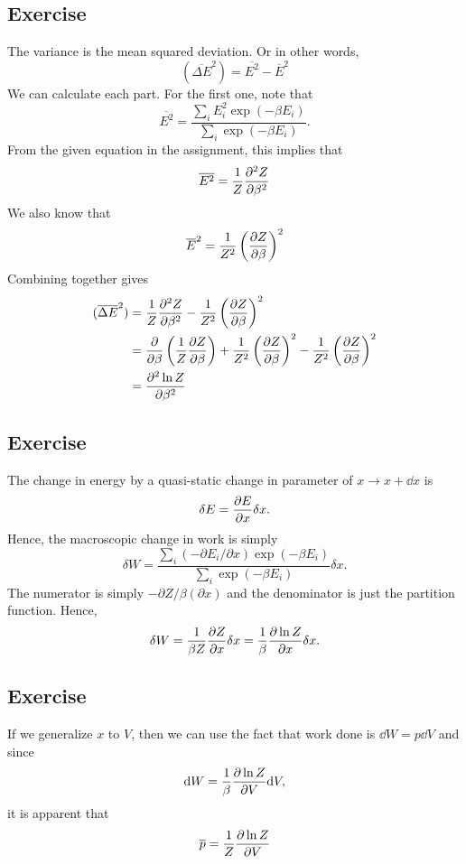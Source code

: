 \subsection{Exercise}
The variance is the mean squared deviation. Or in other words, 
\begin{equation}
    (\overline{\Delta E}^2) = \overline{E^2} - \overline{E}^2
\end{equation}
We can calculate each part. For the first one, note that 
\begin{equation}\overline{E^2} = \frac{\sum_i E_i^2 \exp(-\beta E_i)}{\sum_i \exp(-\beta E_i)}.
\end{equation}
From the given equation in the assignment, this implies that 
\begin{equation}
    \overline{E^2} = \frac{1}{Z}\pdv[2]{Z}{\beta}
\end{equation}
We also know that 
\begin{equation}
    \overline{E}^2 = \frac{1}{Z^2}\left(\pdv{Z}{\beta}\right)^2
\end{equation}
Combining together gives 
\begin{align}
    (\overline{\Delta E}^2) &= \frac{1}{Z}\pdv[2]{Z}{\beta} - \frac{1}{Z^2}\left(\pdv{Z}{\beta}\right)^2 \\
    &= \pdv{}{\beta}\left(\frac{1}{Z}\pdv{Z}{\beta}\right) + \frac{1}{Z^2}\left(\pdv{Z}{\beta}\right)^2 - \frac{1}{Z^2}\left(\pdv{Z}{\beta}\right)^2 \\
    &= \pdv[2]{\ln Z}{\beta}
\end{align}
\subsection{Exercise}
The change in energy by a quasi-static change in parameter of $x\to x+ \dd x$ is 
\begin{equation}
\delta E = \pdv{E}{x}\delta x.
\end{equation}
Hence, the macroscopic change in work is simply 
\begin{equation}\delta W = \frac{\sum_i (-\partial E_i/\partial x) \exp (-\beta E_i)}{\sum_i \exp(-\beta E_i)}\delta x.\end{equation}
The numerator is simply $-\partial Z/\beta (\partial x)$ and the denominator is just the partition function. Hence, 
\begin{equation}
    \delta W = \frac{1}{\beta Z}\pdv{Z}{x}\delta x = \frac{1}{\beta}\pdv{\ln Z}{x}\delta x.
\end{equation}
\subsection{Exercise}
If we generalize $x$ to $V$, then we can use the fact that work done is $\dd W = p\dd V$ and since 
\begin{equation}\label{work}
\dd W = \frac{1}{\beta}\pdv{\ln Z}{V}\dd V, \end{equation}
it is apparent that 
\begin{equation}
    \overline p = \frac{1}{Z}\pdv{\ln Z}{V}
\end{equation}
